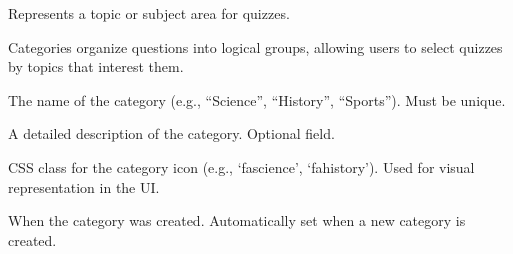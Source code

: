 \documentclass[letterpaper,10pt,english]{sphinxmanual}
\begin{document}
\begin{fulllineitems}
\label{\detokenize{models:Category}}
\pysigstartsignatures
{}
\pysigstopsignatures
\sphinxAtStartPar
Represents a topic or subject area for quizzes.

\sphinxAtStartPar
Categories organize questions into logical groups, allowing users to select
quizzes by topics that interest them.

\begin{fulllineitems}
\label{\detokenize{models:Category.name}}
\pysigstartsignatures
{}
\pysigstopsignatures
\sphinxAtStartPar
The name of the category (e.g., “Science”, “History”, “Sports”).
Must be unique.

\end{fulllineitems}


\begin{fulllineitems}
\label{\detokenize{models:Category.description}}
\pysigstartsignatures
{}
\pysigstopsignatures
\sphinxAtStartPar
A detailed description of the category.
Optional field.

\end{fulllineitems}


\begin{fulllineitems}
\label{\detokenize{models:Category.icon}}
\pysigstartsignatures
{}
\pysigstopsignatures
\sphinxAtStartPar
CSS class for the category icon (e.g., ‘fa\sphinxhyphen{}science’, ‘fa\sphinxhyphen{}history’).
Used for visual representation in the UI.

\end{fulllineitems}


\begin{fulllineitems}
\label{\detokenize{models:Category.created_at}}
\pysigstartsignatures
{}
\pysigstopsignatures
\sphinxAtStartPar
When the category was created.
Automatically set when a new category is created.

\end{fulllineitems}


\end{fulllineitems}
\end{document}
